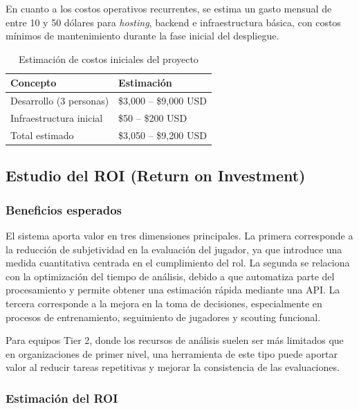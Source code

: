 \documentclass{ULBreport} %
\begin{document}
En cuanto a los costos operativos recurrentes, se estima un gasto mensual de entre 10 y 50 dólares para \textit{hosting}, backend e infraestructura básica, con costos mínimos de mantenimiento durante la fase inicial del despliegue.

\begin{table}[H]
    \centering
    \caption{Estimación de costos iniciales del proyecto}
    \label{tab:costos}
    \begin{tabular}{|l|l|}
        \hline
        \textbf{Concepto} & \textbf{Estimación} \\ \hline
        Desarrollo (3 personas) & \$3,000 -- \$9,000 USD \\ \hline
        Infraestructura inicial & \$50 -- \$200 USD \\ \hline
        Total estimado & \$3,050 -- \$9,200 USD \\ \hline
    \end{tabular}
\end{table}

\subsection{Estudio del ROI (Return on Investment)}

\subsubsection{Beneficios esperados}

El sistema aporta valor en tres dimensiones principales. La primera corresponde a la reducción de subjetividad en la evaluación del jugador, ya que introduce una medida cuantitativa centrada en el cumplimiento del rol. La segunda se relaciona con la optimización del tiempo de análisis, debido a que automatiza parte del procesamiento y permite obtener una estimación rápida mediante una API. La tercera corresponde a la mejora en la toma de decisiones, especialmente en procesos de entrenamiento, seguimiento de jugadores y scouting funcional.

Para equipos Tier 2, donde los recursos de análisis suelen ser más limitados que en organizaciones de primer nivel, una herramienta de este tipo puede aportar valor al reducir tareas repetitivas y mejorar la consistencia de las evaluaciones.

\subsubsection{Estimación del ROI}
\end{document}
